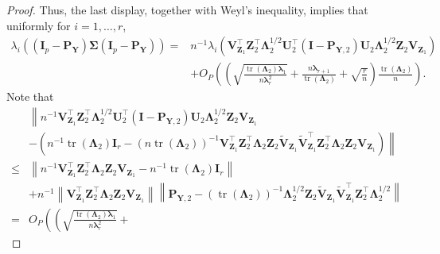 \documentclass[10pt]{book}
\theoremstyle{definition}
\DeclareMathOperator{\mytr}{tr}
\newcommand{\bZ}{\mathbf{Z}}
\newcommand{\bP}{\mathbf{P}}
\newcommand{\bY}{\mathbf{Y}}
\newcommand{\bI}{\mathbf{I}}
\newcommand{\bU}{\mathbf{U}}
\newcommand{\bV}{\mathbf{V}}
\newcommand{\bfsym}[1]{\ensuremath{\boldsymbol{#1}}}
\def\blambda {\bfsym {\lambda}}
\def\bLambda {\bfsym {\Lambda}}
\def\bSigma {\bfsym {\Sigma}}
\begin{document}
\begin{proof}
         Thus, the last display, together with Weyl's inequality, implies that uniformly for $i=1,\ldots, r$,
\begin{equation*}
    \begin{split}
    \lambda_i\left(
             (\bI_p -\bP_\bY)\bSigma (\bI_p- \bP_{\bY})
         \right)
             =&
             n^{-1}\lambda_i\left(
                  \bV_{\bZ_1}^\top \bZ_2^\top \bLambda_2^{1/2} \bU_2^\top (\bI-\bP_{\bY,2}) \bU_2 \bLambda_2^{1/2} \bZ_2 \bV_{\bZ_1}
              \right)
              \\
             &+O_P\left(
                 \left(
                     \sqrt{\frac{\mytr(\bLambda_2)\blambda_1}{n\blambda_r^2}}  
                     +\frac{n\blambda_{r+1}}{\mytr(\bLambda_2)}
                     +\sqrt{\frac{r}{n}}
                 \right)
             \frac{\mytr(\bLambda_2)}{n}\right).
    \end{split}
\end{equation*}
Note that
\begin{equation*}
    \begin{split}
                  &\left\|
                  n^{-1}\bV_{\bZ_1}^\top \bZ_2^\top \bLambda_2^{1/2} \bU_2^\top (\bI-\bP_{\bY,2}) \bU_2 \bLambda_2^{1/2} \bZ_2 \bV_{\bZ_1}
              \right.
              \\
              &\left.
                  -\left(
                      n^{-1}\mytr(\bLambda_2)\bI_r
                  -
            \left(n\mytr(\bLambda_2)\right)^{-1}
            \bV_{\bZ_1}^\top \bZ_2^\top \bLambda_2\bZ_{2} \tilde{\bV}_{\bZ_1}
            \tilde{\bV}_{\bZ_1}^\top \bZ_2^\top \bLambda_2 \bZ_2 \bV_{\bZ_1}
                  \right)
                  \right\|
                  \\
                  \leq&
                  \left\|n^{-1}\bV_{\bZ_1}^\top \bZ_2^\top \bLambda_2 \bZ_2 \bV_{\bZ_1}-
                      n^{-1}\mytr(\bLambda_2)\bI_r
                  \right\|
                  \\
                  &+
                  n^{-1}\left\|\bV_{\bZ_1}^\top \bZ_2^\top \bLambda_2 \bZ_2 \bV_{\bZ_1}\right\|
            \left\|\bP_{\bY,2}-
            \left(\mytr(\bLambda_2)\right)^{-1}
            \bLambda_2^{1/2}\bZ_{2} \tilde{\bV}_{\bZ_1}
            \tilde{\bV}_{\bZ_1}^\top \bZ_2^\top \bLambda_2^{1/2}
            \right\|
            \\
            =& O_P\left(
                \left(
                    \sqrt{\frac{\mytr(\bLambda_2)\blambda_1}{n\blambda_r^2}}
                    +

\end{split}
\end{equation*}
\end{proof}
\end{document}
